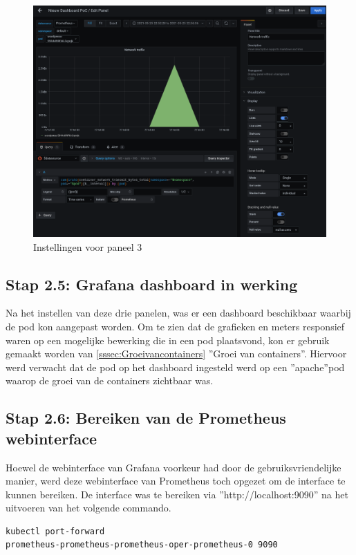 \begin{figure}[!h]
    \centering
        \includegraphics[width=1.1\textwidth]{img/panel4.png}
    \caption{Instellingen voor paneel 3}
\end{figure}

\subsection{Stap 2.5: Grafana dashboard in werking}

Na het instellen van deze drie panelen, was er een dashboard beschikbaar waarbij de pod kon aangepast worden. Om te zien dat de grafieken en meters responsief waren op een mogelijke bewerking die in een pod plaatsvond, kon er gebruik gemaakt worden van \ref{sssec:Groeivancontainers} ''Groei van containers''. Hiervoor werd verwacht dat de pod op het dashboard ingesteld werd op een ''apache''pod waarop de groei van de containers zichtbaar was.
\clearpage

\subsection{Stap 2.6: Bereiken van de Prometheus webinterface}

Hoewel de webinterface van Grafana voorkeur had door de gebruiksvriendelijke manier, werd deze webinterface van Prometheus toch opgezet om de interface te kunnen bereiken. De interface was te bereiken via ''http://localhost:9090'' na het uitvoeren van het volgende commando.

\begin{lstlisting}[language=bash,caption={port forward prometheus}]
kubectl port-forward 
prometheus-prometheus-prometheus-oper-prometheus-0 9090
\end{lstlisting}

